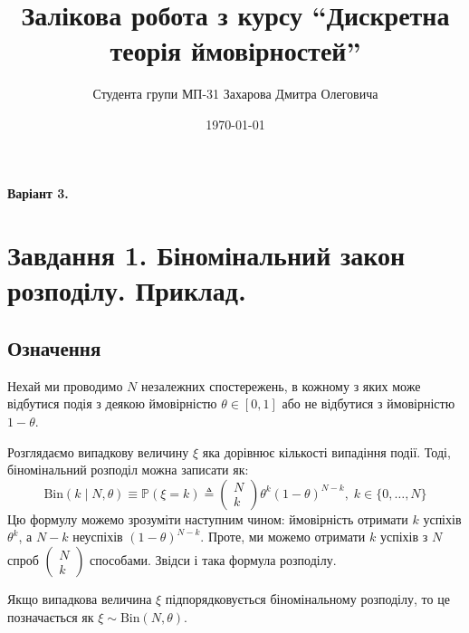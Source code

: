 \documentclass[14pt]{extarticle}
\title{Залікова робота з курсу ``Дискретна теорія ймовірностей''}
\author{Студента групи МП-31 Захарова Дмитра Олеговича}
\date{\today}
\begin{document}
\maketitle

\begin{center}
\textbf{Варіант 3.}
\end{center}

\section*{Завдання 1. Біномінальний закон розподілу. Приклад.} 

\subsection*{Означення}
Нехай ми проводимо $N$ незалежних спостережень, в кожному з яких може відбутися подія з деякою ймовірністю $\theta \in [0,1]$ або не відбутися з ймовірністю $1-\theta$. 

Розглядаємо випадкову величину $\xi$ яка дорівнює кількості випадіння події. Тоді, біномінальний розподіл можна записати як:
\[
\text{Bin}(k \mid N,\theta) \equiv \mathbb{P}(\xi=k) \triangleq \begin{pmatrix}
    N \\ k
\end{pmatrix} \theta^k(1-\theta)^{N-k}, \; k \in \{0,\dots,N\}
\]
Цю формулу можемо зрозуміти наступним чином: ймовірність отримати $k$ успіхів $\theta^k$, а $N-k$ неуспіхів $(1-\theta)^{N-k}$. Проте, ми можемо отримати $k$ успіхів з $N$ спроб $\begin{pmatrix}
    N \\ k
\end{pmatrix}$ способами. Звідси і така формула розподілу. 

Якщо випадкова величина $\xi$ підпорядковується біномінальному розподілу, то це позначається як $\xi \sim \text{Bin}(N,\theta)$. 
\end{document}
